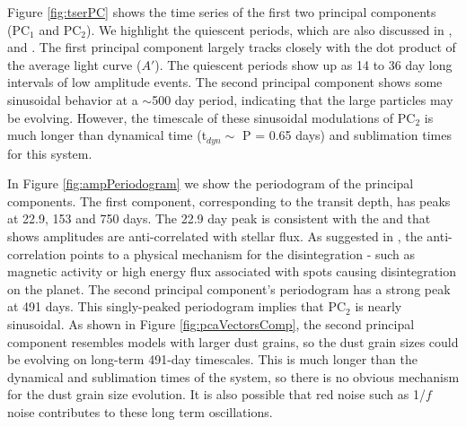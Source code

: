 \documentclass[preprint,trackchanges]{aastex61}
\begin{document}
Figure \ref{fig:tserPC} shows the time series of the first two principal components (PC$_1$ and PC$_2$).
We highlight the quiescent periods, which are also discussed in \citet{kawahara2013starspots}, \citet{vanWerkhoven2014} and \citet{croll2015starspots}.
The first principal component largely tracks closely with the dot product of the average light curve ($A'$).
The quiescent periods show up as 14 to 36 day long intervals of low amplitude events.
The second principal component shows some sinusoidal behavior at a $\sim$500 day period, indicating that the large particles may be evolving.
However, the timescale of these sinusoidal modulations of PC$_2$ is much longer than dynamical time (t$_{dyn} \sim$ P = 0.65 days) and sublimation times \citep[$t_{sub} \sim$1 day][]{rappaport} for this system.

In Figure \ref{fig:ampPeriodogram} we show the periodogram of the principal components.
The first component, corresponding to the transit depth, has peaks at 22.9, 153 and 750 days.
The 22.9 day peak is consistent with the \citet{kawahara2013starspots} and \citet{croll2015starspots} that shows amplitudes are anti-correlated with stellar flux.
As suggested in \citet{kawahara2013starspots}, the anti-correlation points to a physical mechanism for the disintegration - such as magnetic activity or high energy flux associated with spots causing disintegration on the planet.
The second principal component's periodogram has a strong peak at 491 days.
This singly-peaked periodogram  implies that PC$_2$ is nearly sinusoidal.
As shown in Figure \ref{fig:pcaVectorsComp}, the second principal component resembles models with larger dust grains, so the dust grain sizes could be evolving on long-term 491-day timescales.
This is much longer than the dynamical and sublimation times of the system, so there is no obvious mechanism for the dust grain size evolution.
It is also possible that red noise such as 1/$f$ noise contributes to these long term oscillations.
\end{document}
